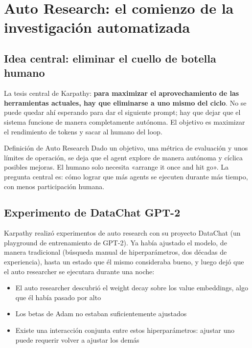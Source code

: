 \documentclass[a4paper]{article}
\begin{document}
\section{Auto Research: el comienzo de la investigación automatizada}

\subsection{Idea central: eliminar el cuello de botella humano}

La tesis central de Karpathy: \textbf{para maximizar el aprovechamiento de las herramientas actuales, hay que eliminarse a uno mismo del ciclo}. No se puede quedar ahí esperando para dar el siguiente prompt; hay que dejar que el sistema funcione de manera completamente autónoma. El objetivo es maximizar el rendimiento de tokens y sacar al humano del loop.

\begin{importantbox}{Definición de Auto Research}
Dado un objetivo, una métrica de evaluación y unos límites de operación, se deja que el agent explore de manera autónoma y cíclica posibles mejoras. El humano solo necesita «arrange it once and hit go». La pregunta central es: cómo lograr que más agents se ejecuten durante más tiempo, con menos participación humana.
\end{importantbox}

\subsection{Experimento de DataChat GPT-2}

Karpathy realizó experimentos de auto research con su proyecto DataChat (un playground de entrenamiento de GPT-2). Ya había ajustado el modelo, de manera tradicional (búsqueda manual de hiperparámetros, dos décadas de experiencia), hasta un estado que él mismo consideraba bueno, y luego dejó que el auto researcher se ejecutara durante una noche:

\begin{itemize}
    \item El auto researcher descubrió el weight decay sobre los value embeddings, algo que él había pasado por alto
    \item Los betas de Adam no estaban suficientemente ajustados
    \item Existe una interacción conjunta entre estos hiperparámetros: ajustar uno puede requerir volver a ajustar los demás
\end{itemize}
\end{document}
